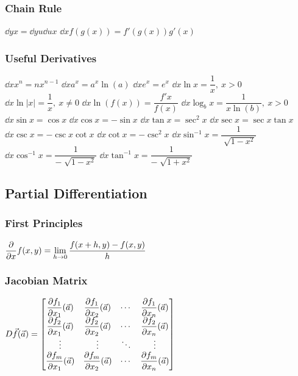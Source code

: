 \subsubsection{Chain Rule}
\begin{itemize}
\itemt \( \dd{y}{x} = \dd{y}{u} \dd{u}{x}\)
\itemt \( \dd{}{x} f(g(x)) = f'(g(x)) g'(x) \)
\end{itemize}

\subsubsection{Useful Derivatives}

\begin{itemize}
\itemt \( \dd{}{x} x^n = nx^{n-1} \)
\itemt \( \dd{}{x} a^x = a^x \ln(a) \)
\itemt \( \dd{}{x} e^x = e^x \)
\itemt \( \dd{}{x} \ln x = \dfrac{1}{x},\ x>0 \)
\itemt \( \dd{}{x} \ln |x| = \dfrac{1}{x},\ x\neq 0 \)
\itemt \( \dd{}{x} \ln(f(x)) = \dfrac{f'x}{f(x)} \)
\itemt \( \dd{}{x} \log_bx = \dfrac{1}{x \ln(b)},\ x>0 \)
\itemt \( \dd{}{x} \sin x = \cos x \)
\itemt \( \dd{}{x} \cos x = -\sin x \)
\itemt \( \dd{}{x} \tan x = \sec^2x \)
\itemt \( \dd{}{x} \sec x = \sec x \tan x \)
\itemt \( \dd{}{x} \csc x = -\csc x \cot x \)
\itemt \( \dd{}{x} \cot x = -\csc^2 x \)
\itemt \( \dd{}{x} \sin^{-1} x = \dfrac{1}{\sqrt[]{1-x^2}} \)
\itemt \( \dd{}{x} \cos^{-1} x = \dfrac{1}{-\sqrt[]{1-x^2}} \)
\itemt \( \dd{}{x} \tan^{-1} x = \dfrac{1}{-\sqrt[]{1+x^2}} \)
\end{itemize}



		\subsection{Partial Differentiation}

\subsubsection{First Principles}
\begin{itemize}
\itemt \( \dfrac{\partial }{\partial x} f(x,y) = \lim\limits_{h\to0} \dfrac{f(x+h,y)-f(x,y)}{h} \)
\end{itemize}

\subsubsection{Jacobian Matrix}
\def\arraystretch{2.5}
\begin{itemize}
\itemt \( D\vec{f}(\vec{a}) = 
\begin{bmatrix}
\dfrac{\partial f_1}{\partial x_1}(\vec{a})	& \dfrac{\partial f_1}{\partial x_2}(\vec{a})	& \cdots 	& \dfrac{\partial f_1}{\partial x_n}(\vec{a}) \\
\dfrac{\partial f_2}{\partial x_1}(\vec{a})	& \dfrac{\partial f_2}{\partial x_2}(\vec{a})	& \cdots 	& \dfrac{\partial f_2}{\partial x_n}(\vec{a}) \\
\vdots						& \vdots					& \ddots	& \vdots \\
\dfrac{\partial f_m}{\partial x_1}(\vec{a})	& \dfrac{\partial f_m}{\partial x_2}(\vec{a})	 & \cdots 	& \dfrac{\partial f_m}{\partial x_n}(\vec{a}) \\
\end{bmatrix}
\)
\end{itemize}

